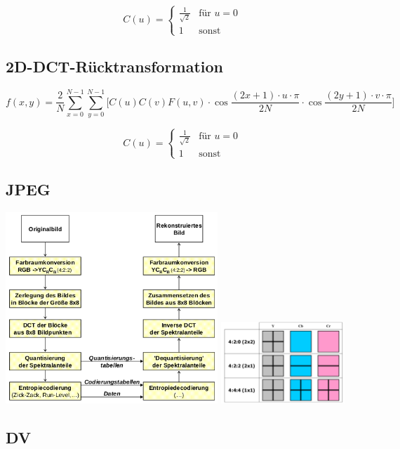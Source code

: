 \[
    C(u) = \begin{cases}
        \frac{1}{\sqrt{2}} & \text{für } u=0\\
        1 & \text{sonst}
    \end{cases}
\]

\subsection*{2D-DCT-Rücktransformation}
\[
    f(x, y) = \frac{2}{N} \sum_{x=0}^{N-1} \sum_{y=0}^{N-1} \bigg[ C(u) C(v) F(u, v) \cdot 
    \cos \frac{(2x + 1) \cdot u \cdot \pi}{2 N} \cdot \cos \frac{(2y + 1) \cdot v \cdot \pi}{2 N} \bigg]
\]
    
\[
    C(u) = \begin{cases}
        \frac{1}{\sqrt{2}} & \text{für } u=0\\
        1 & \text{sonst}
    \end{cases}
\]

\subsection*{JPEG}

\includegraphics[width=0.6\textwidth]{jpeg}
\includegraphics[width=0.35\textwidth]{color_subsampling}

\subsection*{DV}

